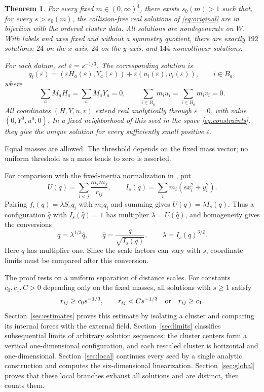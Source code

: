 \documentclass[11pt,a4paper]{amsart}
\newtheorem{theorem}{Theorem}[section]
\numberwithin{equation}{section}
\newcommand{\eps}{\varepsilon}
\begin{document}
\begin{theorem}\label{thm:main}
For every fixed $m\in(0,\infty)^4$, there exists $s_0(m)>1$ such that,
for every $s>s_0(m)$, the collision-free real solutions of
\eqref{eq:original} are in bijection with the ordered cluster data.
All solutions are nondegenerate on $W$. With labels and axes fixed and
without a symmetry quotient, there are exactly $192$ solutions:
$24$ on the $x$-axis, $24$ on the $y$-axis, and $144$ noncollinear solutions.

For each datum, set $\eps=s^{-1/3}$. The corresponding solution is
\begin{equation}\label{eq:branch}
 q_i(\eps)=(\eps H_a(\eps),Y_a(\eps))
                +\eps(u_i(\eps),v_i(\eps)),\qquad i\in B_a,
\end{equation}
where
\begin{equation}\label{eq:constraints}
 \sum_aM_aH_a=\sum_aM_aY_a=0,\qquad
 \sum_{i\in B_a}m_iu_i=\sum_{i\in B_a}m_iv_i=0.
\end{equation}
All coordinates $(H,Y,u,v)$ extend real analytically through $\eps=0$,
with value $(0,Y^0,u^0,0)$. In a fixed neighborhood of this seed in the
space \eqref{eq:constraints}, they give the unique solution for every
sufficiently small positive $\eps$.
\end{theorem}

Equal masses are allowed. The threshold depends on the fixed mass vector;
no uniform threshold as a mass tends to zero is asserted.

For comparison with the fixed-inertia normalization in \cite{AFP,AKT}, put
\[
 U(q)=\sum_{i<j}\frac{m_im_j}{r_{ij}},\qquad
 I_s(q)=\sum_i m_i(sx_i^2+y_i^2).
\]
Pairing $f_i(q)=\lambda S_s q_i$ with $m_iq_i$ and summing gives
$U(q)=\lambda I_s(q)$. Thus a configuration $\widehat q$ with
$I_s(\widehat q)=1$ has multiplier $\lambda=U(\widehat q)$, and
homogeneity gives the conversions
\begin{equation}\label{eq:normalization}
 q=\lambda^{1/3}\widehat q,\qquad
 \widehat q=\frac{q}{\sqrt{I_s(q)}},\qquad
 \lambda=I_s(q)^{3/2}.
\end{equation}
Here $q$ has multiplier one. Since the scale factors can vary with $s$,
coordinate limits must be compared after this conversion.

The proof rests on a uniform separation of distance scales. For constants
$c_0,c_1,C>0$ depending only on the fixed masses, all solutions with $s\ge1$
satisfy
\[
 r_{ij}\ge c_0s^{-1/3},\qquad
 r_{ij}<Cs^{-1/3}\quad\hbox{or}\quad r_{ij}\ge c_1.
\]
Section~\ref{sec:estimates} proves this estimate by isolating a cluster
and comparing its internal forces with the external field.
Section~\ref{sec:limits} classifies subsequential limits of arbitrary
solution sequences: the cluster centers form a vertical one-dimensional
configuration, and each rescaled cluster is horizontal and
one-dimensional. Section~\ref{sec:local} continues every seed by a
single analytic construction and computes the six-dimensional
linearization. Section~\ref{sec:global} proves that these local branches
exhaust all solutions and are distinct, then counts them.
\end{document}
